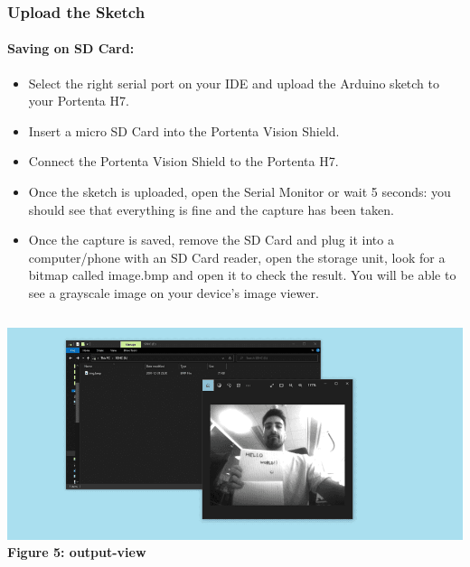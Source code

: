 \documentclass[10pt, a4paper]{beamer}
\begin{document}
	\begin{frame}		
		\frametitle{Upload the Sketch}
		\framesubtitle{Saving on SD Card:}
			\begin{itemize}
				\item Select the right serial port on your IDE and upload the Arduino sketch to your Portenta H7.
				\item Insert a micro SD Card into the Portenta Vision Shield.
				\item Connect the Portenta Vision Shield to the Portenta H7.
				\item Once the sketch is uploaded, open the Serial Monitor or wait 5 seconds: you should see that everything is fine and the capture has been taken.
				\item Once the capture is saved, remove the SD Card and plug it into a computer/phone with an SD Card reader, open the storage unit, look for a bitmap called image.bmp and open it to check the result. You will be able to see a grayscale image on your device's image viewer. \newpage
			\end{itemize}
			
				\begin{columns}
					\centering
					\includegraphics[width=\textwidth]{images/output-view.png}
					\vspace{0.2cm}
					\textbf{Figure 5: output-view}
				\end{columns}

	\end{frame}
	
\end{document}
